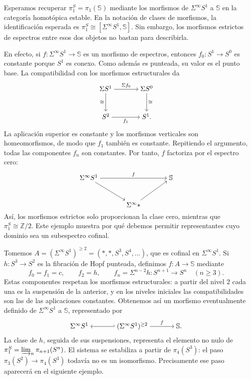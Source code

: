 Esperamos recuperar $\pi_1^S=\pi_1(\mathbb S)$ mediante los morfismos de $\Sigma^\infty S^1$ a $\mathbb S$ en la categoría homotópica estable. En la notación de clases de morfismos, la identificación esperada es $\pi_1^S\cong[\Sigma^\infty S^1,\mathbb S]$. Sin embargo, los morfismos estrictos de espectros entre esos dos objetos no bastan para describirla.

En efecto, si $f\colon\Sigma^\infty S^1\to\mathbb S$ es un morfismo de espectros, entonces $f_0\colon S^1\to S^0$ es constante porque $S^1$ es conexo. Como además es punteada, su valor es el punto base. La compatibilidad con los morfismos estructurales da
\[
\begin{tikzcd}[cramped,column sep=large,row sep=large]
\Sigma S^1 \arrow[r,"\Sigma f_0"] \arrow[d,"\cong"']
& \Sigma S^0 \arrow[d,"\cong"]\\
S^2 \arrow[r,"f_1"'] & S^1.
\end{tikzcd}
\]
La aplicación superior es constante y los morfismos verticales son homeomorfismos, de modo que $f_1$ también es constante. Repitiendo el argumento, todas las componentes $f_n$ son constantes. Por tanto, $f$ factoriza por el espectro cero:
\[
\begin{tikzcd}[cramped,column sep=large,row sep=large]
\Sigma^\infty S^1 \arrow[rr,"f"] \arrow[dr]
&& \mathbb S\\
& \Sigma^\infty * \arrow[ur] &
\end{tikzcd}
\]
Así, los morfismos estrictos solo proporcionan la clase cero, mientras que $\pi_1^S\cong\mathbb Z/2$. Este ejemplo muestra por qué debemos permitir representantes cuyo dominio sea un subespectro cofinal.

Tomemos $A=(\Sigma^\infty S^1)^{\ge2}=(*,*,S^3,S^4,\ldots)$, que es cofinal en $\Sigma^\infty S^1$. Si $h\colon S^3\to S^2$ es la fibración de Hopf punteada, definimos $f\colon A\to\mathbb S$ mediante
\[
f_0=f_1=c,\qquad
f_2=h,\qquad
f_n=\Sigma^{n-2}h\colon S^{n+1}\longrightarrow S^n\quad(n\ge3).
\]
Estas componentes respetan los morfismos estructurales: a partir del nivel $2$ cada una es la suspensión de la anterior, y en los niveles iniciales las compatibilidades son las de las aplicaciones constantes. Obtenemos así un morfismo eventualmente definido de $\Sigma^\infty S^1$ a $\mathbb S$, representado por
\[
\begin{tikzcd}[cramped,column sep=large]
\Sigma^\infty S^1
& (\Sigma^\infty S^1)^{\ge2} \arrow[l,hook'] \arrow[r,"f"]
& \mathbb S.
\end{tikzcd}
\]
La clase de $h$, seguida de sus suspensiones, representa el elemento no nulo de $\pi_1^S=\varinjlim\nolimits_n\pi_{n+1}(S^n)$. El sistema se estabiliza a partir de $\pi_4(S^3)$: el paso $\pi_3(S^2)\to\pi_4(S^3)$ todavía no es un isomorfismo. Precisamente ese paso aparecerá en el siguiente ejemplo.

